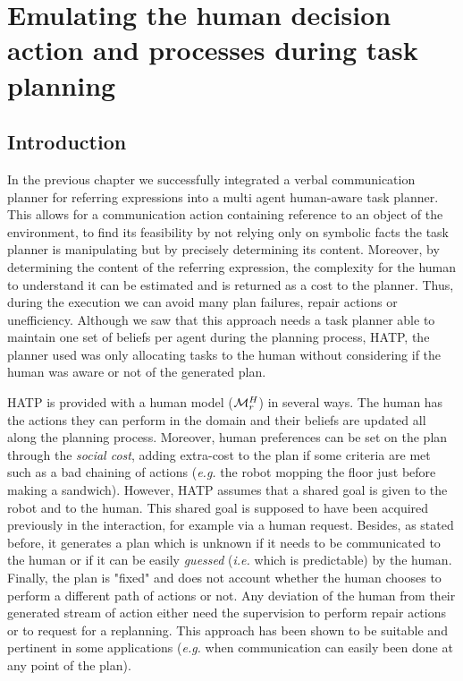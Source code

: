 \documentclass[a4paper,11pt,twoside]{StyleThese}
\begin{document}
\setcounter{chapter}{3} %
\dominitoc
\faketableofcontents
\fi

\chapter{Emulating the human decision action and processes during task planning}
\label{chapter:doublehtn}
\minitoc

\section{Introduction}
In the previous chapter we successfully integrated a verbal communication planner for referring expressions into a multi agent human-aware task planner. This allows for a communication action containing reference to an object of the environment, to find its feasibility by not relying only on symbolic facts the task planner is manipulating but by precisely determining its content. Moreover, by determining the content of the referring expression, the complexity for the human to understand it can be estimated and is returned as a cost to the planner. Thus, during the execution we can avoid many plan failures, repair actions or unefficiency. Although we saw that this approach needs a task planner able to maintain one set of beliefs per agent during the planning process, HATP, the planner used was only allocating tasks to the human without considering if the human was aware or not of the generated plan.

HATP is provided with a human model ($\mathcal{M}^H_r$) in several ways. The human has the actions they can perform in the domain and their beliefs are updated all along the planning process. Moreover, human preferences can be set on the plan through the \textit{social cost}, adding extra-cost to the plan if some criteria are met such as a bad chaining of actions (\textit{e.g.} the robot mopping the floor just before making a sandwich). However, HATP assumes that a shared goal is given to the robot and to the human. This shared goal is supposed to have been acquired previously in the interaction, for example via a human request. Besides, as stated before, it generates a plan which is unknown if it needs to be communicated to the human or if it can be easily \textit{guessed} (\textit{i.e.} which is predictable) by the human. Finally, the plan is "fixed" and does not account whether the human chooses to perform a different path of actions or not. Any deviation of the human from their generated stream of action either need the supervision to perform repair actions or to request for a replanning. This approach has been shown to be suitable and pertinent in some applications (\textit{e.g.} when communication can easily been done at any point of the plan).
\end{document}
